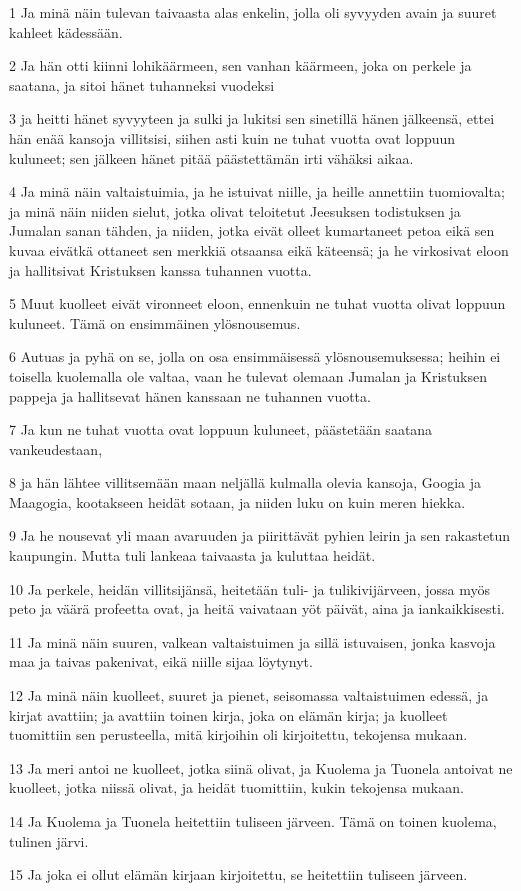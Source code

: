 \par 1 Ja minä näin tulevan taivaasta alas enkelin, jolla oli syvyyden avain ja suuret kahleet kädessään.
\par 2 Ja hän otti kiinni lohikäärmeen, sen vanhan käärmeen, joka on perkele ja saatana, ja sitoi hänet tuhanneksi vuodeksi
\par 3 ja heitti hänet syvyyteen ja sulki ja lukitsi sen sinetillä hänen jälkeensä, ettei hän enää kansoja villitsisi, siihen asti kuin ne tuhat vuotta ovat loppuun kuluneet; sen jälkeen hänet pitää päästettämän irti vähäksi aikaa.
\par 4 Ja minä näin valtaistuimia, ja he istuivat niille, ja heille annettiin tuomiovalta; ja minä näin niiden sielut, jotka olivat teloitetut Jeesuksen todistuksen ja Jumalan sanan tähden, ja niiden, jotka eivät olleet kumartaneet petoa eikä sen kuvaa eivätkä ottaneet sen merkkiä otsaansa eikä käteensä; ja he virkosivat eloon ja hallitsivat Kristuksen kanssa tuhannen vuotta.
\par 5 Muut kuolleet eivät vironneet eloon, ennenkuin ne tuhat vuotta olivat loppuun kuluneet. Tämä on ensimmäinen ylösnousemus.
\par 6 Autuas ja pyhä on se, jolla on osa ensimmäisessä ylösnousemuksessa; heihin ei toisella kuolemalla ole valtaa, vaan he tulevat olemaan Jumalan ja Kristuksen pappeja ja hallitsevat hänen kanssaan ne tuhannen vuotta.
\par 7 Ja kun ne tuhat vuotta ovat loppuun kuluneet, päästetään saatana vankeudestaan,
\par 8 ja hän lähtee villitsemään maan neljällä kulmalla olevia kansoja, Googia ja Maagogia, kootakseen heidät sotaan, ja niiden luku on kuin meren hiekka.
\par 9 Ja he nousevat yli maan avaruuden ja piirittävät pyhien leirin ja sen rakastetun kaupungin. Mutta tuli lankeaa taivaasta ja kuluttaa heidät.
\par 10 Ja perkele, heidän villitsijänsä, heitetään tuli- ja tulikivijärveen, jossa myös peto ja väärä profeetta ovat, ja heitä vaivataan yöt päivät, aina ja iankaikkisesti.
\par 11 Ja minä näin suuren, valkean valtaistuimen ja sillä istuvaisen, jonka kasvoja maa ja taivas pakenivat, eikä niille sijaa löytynyt.
\par 12 Ja minä näin kuolleet, suuret ja pienet, seisomassa valtaistuimen edessä, ja kirjat avattiin; ja avattiin toinen kirja, joka on elämän kirja; ja kuolleet tuomittiin sen perusteella, mitä kirjoihin oli kirjoitettu, tekojensa mukaan.
\par 13 Ja meri antoi ne kuolleet, jotka siinä olivat, ja Kuolema ja Tuonela antoivat ne kuolleet, jotka niissä olivat, ja heidät tuomittiin, kukin tekojensa mukaan.
\par 14 Ja Kuolema ja Tuonela heitettiin tuliseen järveen. Tämä on toinen kuolema, tulinen järvi.
\par 15 Ja joka ei ollut elämän kirjaan kirjoitettu, se heitettiin tuliseen järveen.

